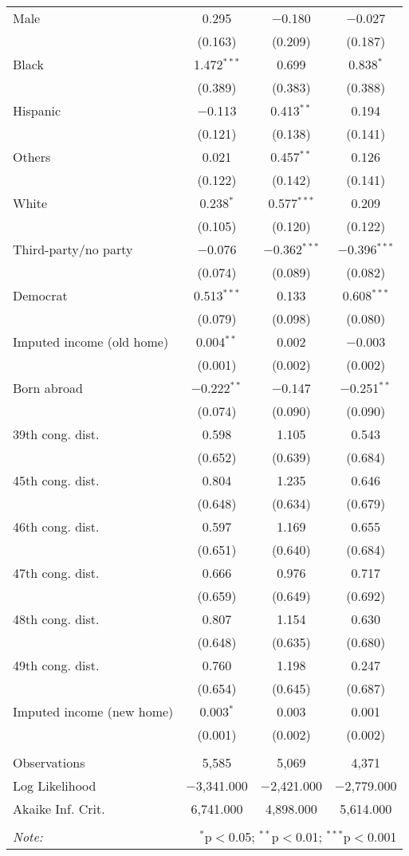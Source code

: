 \begin{tabular}{@{\extracolsep{5pt}}lccc}
  Male & 0.295 & $-$0.180 & $-$0.027 \\ 
  & (0.163) & (0.209) & (0.187) \\ 
  Black & 1.472$^{***}$ & 0.699 & 0.838$^{*}$ \\ 
  & (0.389) & (0.383) & (0.388) \\ 
  Hispanic & $-$0.113 & 0.413$^{**}$ & 0.194 \\ 
  & (0.121) & (0.138) & (0.141) \\ 
  Others & 0.021 & 0.457$^{**}$ & 0.126 \\ 
  & (0.122) & (0.142) & (0.141) \\ 
  White & 0.238$^{*}$ & 0.577$^{***}$ & 0.209 \\ 
  & (0.105) & (0.120) & (0.122) \\ 
  Third-party/no party & $-$0.076 & $-$0.362$^{***}$ & $-$0.396$^{***}$ \\ 
  & (0.074) & (0.089) & (0.082) \\ 
  Democrat & 0.513$^{***}$ & 0.133 & 0.608$^{***}$ \\ 
  & (0.079) & (0.098) & (0.080) \\ 
  Imputed income (old home) & 0.004$^{**}$ & 0.002 & $-$0.003 \\ 
  & (0.001) & (0.002) & (0.002) \\ 
  Born abroad & $-$0.222$^{**}$ & $-$0.147 & $-$0.251$^{**}$ \\ 
  & (0.074) & (0.090) & (0.090) \\ 
  39th cong. dist. & 0.598 & 1.105 & 0.543 \\ 
  & (0.652) & (0.639) & (0.684) \\ 
  45th cong. dist. & 0.804 & 1.235 & 0.646 \\ 
  & (0.648) & (0.634) & (0.679) \\ 
  46th cong. dist. & 0.597 & 1.169 & 0.655 \\ 
  & (0.651) & (0.640) & (0.684) \\ 
  47th cong. dist. & 0.666 & 0.976 & 0.717 \\ 
  & (0.659) & (0.649) & (0.692) \\ 
  48th cong. dist. & 0.807 & 1.154 & 0.630 \\ 
  & (0.648) & (0.635) & (0.680) \\ 
  49th cong. dist. & 0.760 & 1.198 & 0.247 \\ 
  & (0.654) & (0.645) & (0.687) \\ 
  Imputed income (new home) & 0.003$^{*}$ & 0.003 & 0.001 \\ 
  & (0.001) & (0.002) & (0.002) \\ 
 \hline \\[-1.8ex] 
Observations & 5,585 & 5,069 & 4,371 \\ 
Log Likelihood & $-$3,341.000 & $-$2,421.000 & $-$2,779.000 \\ 
Akaike Inf. Crit. & 6,741.000 & 4,898.000 & 5,614.000 \\ 
\hline 
\hline \\[-1.8ex] 
\textit{Note:}  & \multicolumn{3}{r}{$^{*}$p$<$0.05; $^{**}$p$<$0.01; $^{***}$p$<$0.001} \\ 
\end{tabular} 
